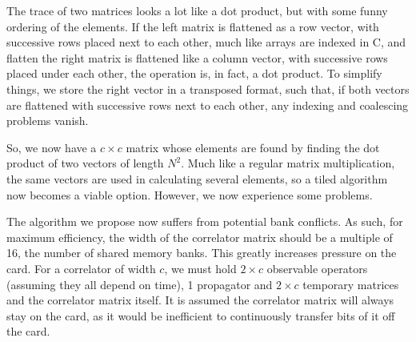\documentclass[a4paper,12pt]{report}
\begin{document}
The trace of two matrices looks a lot like a dot product, but with some funny ordering of the elements.
If the left matrix is flattened as a row vector, with successive rows placed next to each other, much like arrays are indexed in C, and flatten the right matrix is flattened like a column vector, with successive rows placed under each other, the operation is, in fact, a dot product.
To simplify things, we store the right vector in a transposed format, such that, if both vectors are flattened with successive rows next to each other, any indexing and coalescing problems vanish.

So, we now have a $c \times c$ matrix whose elements are found by finding the dot product of two vectors of length $N^2$.
Much like a regular matrix multiplication, the same vectors are used in calculating several elements, so a tiled algorithm now becomes a viable option.
However, we now experience some problems.

The algorithm we propose now suffers from potential bank conflicts.
As such, for maximum efficiency, the width of the correlator matrix should be a multiple of 16, the number of shared memory banks.
This greatly increases pressure on the card.
For a correlator of width $c$, we must hold $2 \times c$ observable operators (assuming they all depend on time), 1 propagator and $2 \times c$ temporary matrices and the correlator matrix itself.
It is assumed the correlator matrix will always stay on the card, as it would be inefficient to continuously transfer bits of it off the card.
\end{document}
